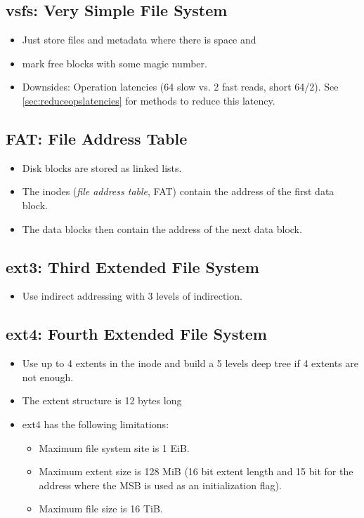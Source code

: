 		\subsection{vsfs: Very Simple File System}
			\begin{itemize}
				\item Just store files and metadata where there is space and
				\item mark free blocks with some magic number.
				\item Downsides: Operation latencies (64 slow vs. 2 fast reads, short 64/2). See \ref{sec:reduceopslatencies} for methods to reduce this latency.
			\end{itemize}

		\subsection{FAT: File Address Table}
			\begin{itemize}
				\item Disk blocks are stored as linked lists.
				\item The inodes (\textit{file address table}, FAT) contain the address of the first data block.
				\item The data blocks then contain the address of the next data block.
			\end{itemize}

		\subsection{ext3: Third Extended File System}
			\begin{itemize}
				\item Use indirect addressing with 3 levels of indirection.
			\end{itemize}


		\subsection{ext4: Fourth Extended File System}
			\begin{itemize}
				\item Use up to 4 extents in the inode and build a 5 levels deep tree if 4 extents are not enough.
				\item The extent structure is 12 bytes long
				\item ext4 has the following limitations:
					\begin{itemize}
						\item Maximum file system site is 1 EiB.
						\item Maximum extent size is 128 MiB (16 bit extent length and 15 bit for the address where the MSB is used as an initialization flag).
						\item Maximum file size is 16 TiB.
					\end{itemize}
			\end{itemize}

